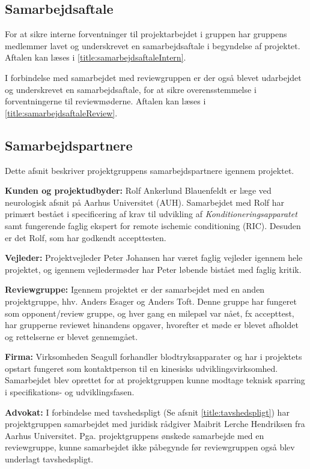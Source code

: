 \subsection{Samarbejdsaftale}
For at sikre interne forventninger til projektarbejdet i gruppen har gruppens medlemmer lavet og underskrevet en samarbejdsaftale i begyndelse af projektet. Aftalen kan læses i \ref{title:samarbejdsaftaleIntern}.

I forbindelse med samarbejdet med reviewgruppen er der også blevet udarbejdet og underskrevet en samarbejdsaftale, for at sikre overensstemmelse i forventningerne til reviewmøderne. Aftalen kan læses i \ref{title:samarbejdsaftaleReview}.

\subsection{Samarbejdspartnere} \label{title:samarbejdspartnere}
Dette afsnit beskriver projektgruppens samarbejdspartnere igennem projektet. 

\textbf{Kunden og projektudbyder:} Rolf Ankerlund Blauenfeldt er læge ved neurologisk afsnit på Aarhus Universitet (AUH). Samarbejdet med Rolf har primært bestået i specificering af krav til udvikling af \textit{Konditioneringsapparatet} samt fungerende faglig ekspert for remote ischemic conditioning (RIC). Desuden er det Rolf, som har godkendt accepttesten.

\textbf{Vejleder:} Projektvejleder Peter Johansen har været faglig vejleder igennem hele projektet, og igennem vejledermøder har Peter løbende bistået med faglig kritik. 

\textbf{Reviewgruppe:} Igennem projektet er der samarbejdet med en anden projektgruppe, hhv. Anders Esager og Anders Toft. Denne gruppe har fungeret som opponent/review gruppe, og hver gang en milepæl var nået, fx accepttest, har grupperne reviewet hinandens opgaver, hvorefter et møde er blevet afholdet og rettelserne er blevet gennemgået.  

\textbf{Firma:} Virksomheden Seagull forhandler blodtryksapparater og har i projektets opstart fungeret som kontaktperson til en kinesisks udviklingsvirksomhed. Samarbejdet blev oprettet for at projektgruppen kunne modtage teknisk sparring i specifikations- og udviklingsfasen. 

\textbf{Advokat:} I forbindelse med tavshedspligt (Se afsnit \ref{title:tavshedspligt}) har projektgruppen samarbejdet med juridisk rådgiver Maibrit Lerche Hendriksen fra Aarhus Universitet. Pga. projektgruppens ønskede samarbejde med en reviewgruppe, kunne samarbejdet ikke påbegynde før reviewgruppen også blev underlagt tavshedspligt.

